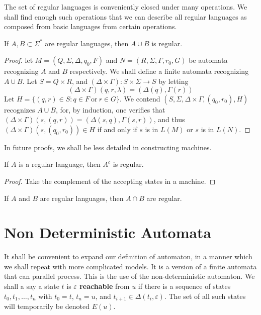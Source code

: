 The set of regular languages is conveniently closed under many operations. We shall find enough such operations that we can describe all regular languages as composed from basic languages from certain operations.

\begin{theorem}
    If $A, B \subset \Sigma^*$ are regular languages, then $A \cup B$ is regular.
\end{theorem}
\begin{proof}
    let $M = (Q, \Sigma, \Delta, q_0, F)$ and $N = (R, \Sigma, \Gamma, r_0, G)$ be automata recognizing $A$ and $B$ respectively. We shall define a finite automata recognizing $A \cup B$. Let $S = Q \times R$, and $(\Delta \times \Gamma): S \times \Sigma \to S$ by letting
    \[ (\Delta \times \Gamma)(q,r,\lambda) = (\Delta(q), \Gamma(r)) \]
    Let $H = \{ (q,r) \in S : q \in F\ \text{or}\ r \in G \}$. We contend $(S, \Sigma, \Delta \times \Gamma, (q_0, r_0), H)$ recognizes $A \cup B$, for, by induction, one verifies that $(\Delta \times \Gamma)(s, (q,r)) = (\Delta(s,q), \Gamma(s,r))$, and thus $(\Delta \times \Gamma)(s, (q_0,r_0)) \in H$ if and only if $s$ is in $L(M)$ or $s$ is in $L(N)$.
\end{proof}

In future proofs, we shall be less detailed in constructing machines.

\begin{theorem}
    If $A$ is a regular language, then $A^c$ is regular.
\end{theorem}
\begin{proof}
    Take the complement of the accepting states in a machine.
\end{proof}

\begin{corollary}
    If $A$ and $B$ are regular languages, then $A \cap B$ are regular.
\end{corollary}

\section{Non Deterministic Automata}

It shall be convenient to expand our definition of automaton, in a manner which we shall repeat with more complicated models. It is a version of a finite automata that can parallel process. This is the use of the non-deterministic automaton. We shall a say a state $t$ is {\bf $\varepsilon$ reachable} from $u$ if there is a sequence of states $t_0, t_1, \dots, t_n$ with $t_0 = t$, $t_n = u$, and $t_{i+1} \in \Delta(t_i, \varepsilon)$. The set of all such states will temporarily be denoted $E(u)$.

